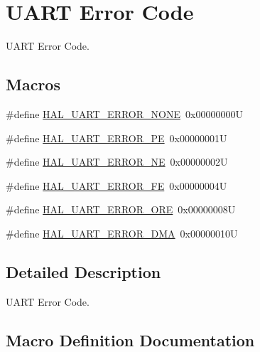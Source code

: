 \hypertarget{group___u_a_r_t___error___code}{}\section{U\+A\+RT Error Code}
\label{group___u_a_r_t___error___code}


U\+A\+RT Error Code.  


\subsection*{Macros}
\begin{DoxyCompactItemize}
\item 
\#define \mbox{\hyperlink{group___u_a_r_t___error___code_ga275de35cb518c19c284764f3ecb1aac5}{H\+A\+L\+\_\+\+U\+A\+R\+T\+\_\+\+E\+R\+R\+O\+R\+\_\+\+N\+O\+NE}}~0x00000000U
\item 
\#define \mbox{\hyperlink{group___u_a_r_t___error___code_gad447a37701acd199dcb653ce32917970}{H\+A\+L\+\_\+\+U\+A\+R\+T\+\_\+\+E\+R\+R\+O\+R\+\_\+\+PE}}~0x00000001U
\item 
\#define \mbox{\hyperlink{group___u_a_r_t___error___code_ga4a4e32a346dd01f4c41c4fc27afbc72c}{H\+A\+L\+\_\+\+U\+A\+R\+T\+\_\+\+E\+R\+R\+O\+R\+\_\+\+NE}}~0x00000002U
\item 
\#define \mbox{\hyperlink{group___u_a_r_t___error___code_gaf23cb510d4dc2c8e05a45abfbf5f3457}{H\+A\+L\+\_\+\+U\+A\+R\+T\+\_\+\+E\+R\+R\+O\+R\+\_\+\+FE}}~0x00000004U
\item 
\#define \mbox{\hyperlink{group___u_a_r_t___error___code_gaedc030add6c499cf41be7f12dd95930c}{H\+A\+L\+\_\+\+U\+A\+R\+T\+\_\+\+E\+R\+R\+O\+R\+\_\+\+O\+RE}}~0x00000008U
\item 
\#define \mbox{\hyperlink{group___u_a_r_t___error___code_gac1d608ae3499a449cd6cd102e7f86605}{H\+A\+L\+\_\+\+U\+A\+R\+T\+\_\+\+E\+R\+R\+O\+R\+\_\+\+D\+MA}}~0x00000010U
\end{DoxyCompactItemize}


\subsection{Detailed Description}
U\+A\+RT Error Code. 



\subsection{Macro Definition Documentation}
\mbox{\label{group___u_a_r_t___error___code_gac1d608ae3499a449cd6cd102e7f86605}} 
